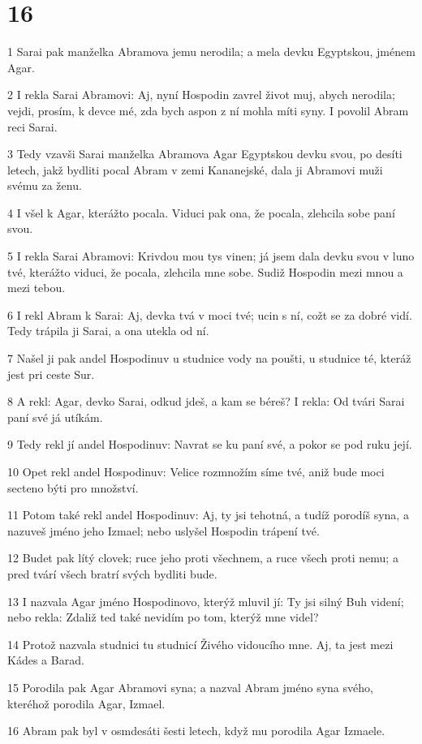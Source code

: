 \chapter{16}

\par 1 Sarai pak manželka Abramova jemu nerodila; a mela devku Egyptskou, jménem Agar.
\par 2 I rekla Sarai Abramovi: Aj, nyní Hospodin zavrel život muj, abych nerodila; vejdi, prosím, k devce mé, zda bych aspon z ní mohla míti syny. I povolil Abram reci Sarai.
\par 3 Tedy vzavši Sarai manželka Abramova Agar Egyptskou devku svou, po desíti letech, jakž bydliti pocal Abram v zemi Kananejské, dala ji Abramovi muži svému za ženu.
\par 4 I všel k Agar, kterážto pocala. Viduci pak ona, že pocala, zlehcila sobe paní svou.
\par 5 I rekla Sarai Abramovi: Krivdou mou tys vinen; já jsem dala devku svou v luno tvé, kterážto viduci, že pocala, zlehcila mne sobe. Sudiž Hospodin mezi mnou a mezi tebou.
\par 6 I rekl Abram k Sarai: Aj, devka tvá v moci tvé; ucin s ní, cožt se za dobré vidí. Tedy trápila ji Sarai, a ona utekla od ní.
\par 7 Našel ji pak andel Hospodinuv u studnice vody na poušti, u studnice té, kteráž jest pri ceste Sur.
\par 8 A rekl: Agar, devko Sarai, odkud jdeš, a kam se béreš? I rekla: Od tvári Sarai paní své já utíkám.
\par 9 Tedy rekl jí andel Hospodinuv: Navrat se ku paní své, a pokor se pod ruku její.
\par 10 Opet rekl andel Hospodinuv: Velice rozmnožím síme tvé, aniž bude moci secteno býti pro množství.
\par 11 Potom také rekl andel Hospodinuv: Aj, ty jsi tehotná, a tudíž porodíš syna, a nazuveš jméno jeho Izmael; nebo uslyšel Hospodin trápení tvé.
\par 12 Budet pak lítý clovek; ruce jeho proti všechnem, a ruce všech proti nemu; a pred tvárí všech bratrí svých bydliti bude.
\par 13 I nazvala Agar jméno Hospodinovo, kterýž mluvil jí: Ty jsi silný Buh videní; nebo rekla: Zdaliž ted také nevidím po tom, kterýž mne videl?
\par 14 Protož nazvala studnici tu studnicí Živého vidoucího mne. Aj, ta jest mezi Kádes a Barad.
\par 15 Porodila pak Agar Abramovi syna; a nazval Abram jméno syna svého, kteréhož porodila Agar, Izmael.
\par 16 Abram pak byl v osmdesáti šesti letech, když mu porodila Agar Izmaele.

